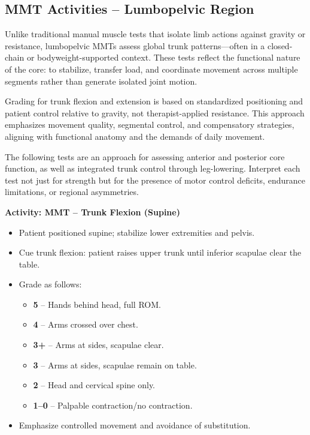 \subsection*{MMT Activities – Lumbopelvic Region}

Unlike traditional manual muscle tests that isolate limb actions against gravity or resistance, lumbopelvic MMTs assess global trunk patterns—often in a closed-chain or bodyweight-supported context. These tests reflect the functional nature of the core: to stabilize, transfer load, and coordinate movement across multiple segments rather than generate isolated joint motion.

Grading for trunk flexion and extension is based on standardized positioning and patient control relative to gravity, not therapist-applied resistance. This approach emphasizes movement quality, segmental control, and compensatory strategies, aligning with functional anatomy and the demands of daily movement.

The following tests are an approach for assessing anterior and posterior core function, as well as integrated trunk control through leg-lowering. Interpret each test not just for strength but for the presence of motor control deficits, endurance limitations, or regional asymmetries.

\begin{labactivitybox}
\textbf{Activity: MMT – Trunk Flexion (Supine)}

\begin{itemize}
  \item Patient positioned supine; stabilize lower extremities and pelvis.
  \item Cue trunk flexion: patient raises upper trunk until inferior scapulae clear the table.
  \item Grade as follows:
    \begin{itemize}
      \item \textbf{5} – Hands behind head, full ROM.
      \item \textbf{4} – Arms crossed over chest.
      \item \textbf{3+} – Arms at sides, scapulae clear.
      \item \textbf{3} – Arms at sides, scapulae remain on table.
      \item \textbf{2} – Head and cervical spine only.
      \item \textbf{1–0} – Palpable contraction/no contraction.
    \end{itemize}
  \item Emphasize controlled movement and avoidance of substitution.
\end{itemize}
\end{labactivitybox}

